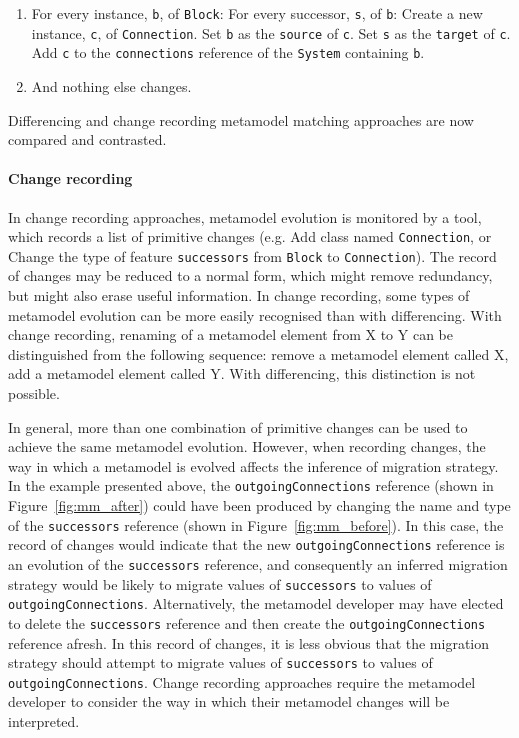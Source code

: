 \begin{enumerate}
	\item For every instance, \texttt{b}, of \texttt{Block}:
		\subitem For every successor, \texttt{s}, of \texttt{b}:
			\subsubitem Create a new instance, \texttt{c}, of \texttt{Connection}.
			\subsubitem Set \texttt{b} as the \texttt{source} of \texttt{c}.
			\subsubitem Set \texttt{s} as the \texttt{target} of \texttt{c}.
			\subsubitem Add \texttt{c} to the \texttt{connections} reference of the \texttt{System} containing \texttt{b}.
	\item And nothing else changes.
\end{enumerate}


Differencing and change recording metamodel matching approaches are now compared and contrasted. 

\paragraph{Change recording}
In change recording approaches, metamodel evolution is monitored by a tool, which records a list of primitive changes (e.g. Add class named \texttt{Connection}, or Change the type of feature \texttt{successors} from \texttt{Block} to \texttt{Connection}). The record of changes may be reduced to a normal form, which might remove redundancy, but might also erase useful information. In change recording, some types of metamodel evolution can be more easily recognised than with differencing. With change recording, renaming of a metamodel element from X to Y can be distinguished from the following sequence: remove a metamodel element called X, add a metamodel element called Y. With differencing, this distinction is not possible.

In general, more than one combination of primitive changes can be used to achieve the same metamodel evolution. However, when recording changes, the way in which a metamodel is evolved affects the inference of migration strategy. In the example presented above, the \texttt{outgoingConnections} reference (shown in Figure~\ref{fig:mm_after}) could have been produced by changing the name and type of the \texttt{successors} reference (shown in Figure~\ref{fig:mm_before}). In this case, the record of changes would indicate that the new \texttt{outgoingConnections} reference is an evolution of the \texttt{successors} reference, and consequently an inferred migration strategy would be likely to migrate values of \texttt{successors} to values of \texttt{out\-go\-ingCon\-nect\-ions}. Alternatively, the metamodel developer may have elected to delete the \texttt{successors} reference and then create the \texttt{out\-go\-ingCon\-nect\-ions} reference afresh. In this record of changes, it is less obvious that the migration strategy should attempt to migrate values of \texttt{successors} to values of \texttt{out\-go\-ingCon\-nect\-ions}. Change recording approaches require the metamodel developer to consider the way in which their metamodel changes will be interpreted.

